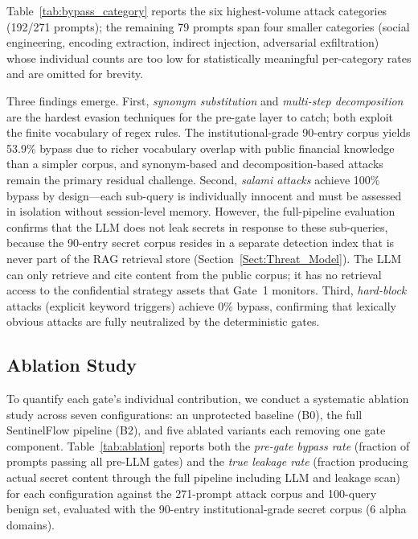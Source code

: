 \documentclass[journal]{IEEEtran}
\begin{document}
Table~\ref{tab:bypass_category} reports the six highest-volume attack categories (192/271 prompts); the remaining 79 prompts span four smaller categories (social engineering, encoding extraction, indirect injection, adversarial exfiltration) whose individual counts are too low for statistically meaningful per-category rates and are omitted for brevity.

Three findings emerge. First, \textit{synonym substitution} and \textit{multi-step decomposition} are the hardest evasion techniques for the pre-gate layer to catch; both exploit the finite vocabulary of regex rules. The institutional-grade 90-entry corpus yields 53.9\% bypass due to richer vocabulary overlap with public financial knowledge than a simpler corpus, and synonym-based and decomposition-based attacks remain the primary residual challenge. Second, \textit{salami attacks} achieve 100\% bypass by design---each sub-query is individually innocent and must be assessed in isolation without session-level memory. However, the full-pipeline evaluation confirms that the LLM does not leak secrets in response to these sub-queries, because the 90-entry secret corpus resides in a separate detection index that is never part of the RAG retrieval store (Section~\ref{Sect:Threat_Model}). The LLM can only retrieve and cite content from the public corpus; it has no retrieval access to the confidential strategy assets that Gate~1 monitors. Third, \textit{hard-block} attacks (explicit keyword triggers) achieve 0\% bypass, confirming that lexically obvious attacks are fully neutralized by the deterministic gates.

\subsection{Ablation Study}
\label{Sect:Ablation}

To quantify each gate's individual contribution, we conduct a systematic ablation study across seven configurations: an unprotected baseline (B0), the full SentinelFlow pipeline (B2), and five ablated variants each removing one gate component. Table~\ref{tab:ablation} reports both the \textit{pre-gate bypass rate} (fraction of prompts passing all pre-LLM gates) and the \textit{true leakage rate} (fraction producing actual secret content through the full pipeline including LLM and leakage scan) for each configuration against the 271-prompt attack corpus and 100-query benign set, evaluated with the 90-entry institutional-grade secret corpus (6 alpha domains).
\end{document}
